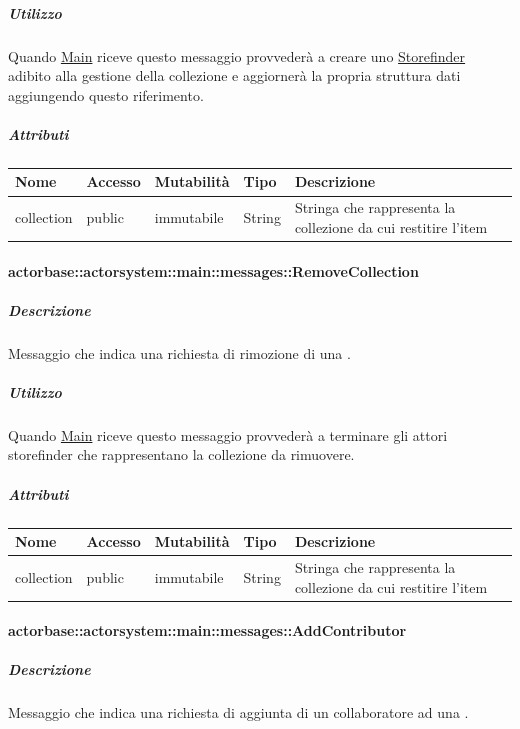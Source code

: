 \documentclass{scalatekids-article}
\begin{document}
\subparagraph{Utilizzo}
Quando \hyperref[sec:actorbase::actorsystem::main::Main]{Main}
riceve questo messaggio provvederà a creare uno \hyperref[sec:actorbase::actorsystem::storefinder::Storefinder]{Storefinder} adibito
alla gestione della collezione e aggiornerà la propria struttura dati
aggiungendo questo riferimento.

\subparagraph{Attributi}
\begin{tabular}{| p{3cm} | p{1.5cm} | p{2cm} | p{2cm} | p{8.5cm} |}
  \hline
  Nome & Accesso & Mutabilità & Tipo & Descrizione\\
  \hline
  collection & public & immutabile & String & Stringa che rappresenta la collezione da cui restitire l'item\\
  \hline
\end{tabular}

\paragraph{actorbase::actorsystem::main::messages::RemoveCollection}
\label{sec:actorbase::actorsystem::main::messages::RemoveCollection}

\subparagraph{Descrizione}
Messaggio che indica una richiesta di rimozione di una .

\subparagraph{Utilizzo}
Quando \hyperref[sec:actorbase::actorsystem::main::Main]{Main}
riceve questo messaggio provvederà a terminare gli attori storefinder
che rappresentano la collezione da rimuovere.

\subparagraph{Attributi}
\begin{tabular}{| p{3cm} | p{1.5cm} | p{2cm} | p{2cm} | p{8.5cm} |}
  \hline
  Nome & Accesso & Mutabilità & Tipo & Descrizione\\
  \hline
  collection & public & immutabile & String & Stringa che rappresenta la collezione da cui restitire l'item\\
  \hline
\end{tabular}

\paragraph{actorbase::actorsystem::main::messages::AddContributor}
\label{sec:actorbase::actorsystem::main::messages::AddContributor}

\subparagraph{Descrizione}

Messaggio che indica una richiesta di aggiunta di un collaboratore ad una
.
\end{document}
